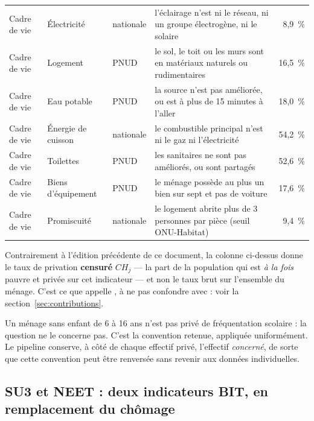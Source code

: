 \documentclass[11pt,a4paper]{article}
\begin{document}
\begin{center}
\begin{longtable}{@{}>{\RaggedRight}p{2.1cm}>{\RaggedRight}p{2.5cm}l>{\RaggedRight}p{5.4cm}r@{}}
\midrule
Cadre de vie & Électricité & nationale & l'éclairage n'est ni le réseau, ni un groupe
électrogène, ni le solaire & 8,9~\% \\
Cadre de vie & Logement & PNUD & le sol, le toit ou les murs sont en matériaux naturels ou
rudimentaires & 16,5~\% \\
Cadre de vie & Eau potable & PNUD & la source n'est pas améliorée, ou est à plus de 15 minutes
à l'aller & 18,0~\% \\
Cadre de vie & Énergie de cuisson & nationale & le combustible principal n'est ni le gaz ni
l'électricité & 54,2~\% \\
Cadre de vie & Toilettes & PNUD & les sanitaires ne sont pas améliorés, ou sont partagés
& 52,6~\% \\
Cadre de vie & Biens d'équipement & PNUD & le ménage possède au plus un bien sur sept et pas de
voiture & 17,6~\% \\
Cadre de vie & Promiscuité & nationale & le logement abrite plus de 3 personnes par pièce
(seuil ONU-Habitat) & 9,4~\% \\
\bottomrule
\end{longtable}
\end{center}

\begin{attention}
Contrairement à l'édition précédente de ce document, la colonne ci-dessus donne le taux de
privation \textbf{censuré} $CH_j$ --- la part de la population qui est \emph{à la fois} pauvre et
privée sur cet indicateur --- et non le taux brut sur l'ensemble du ménage. C'est ce que
 appelle , à ne pas confondre avec
 : voir la section~\ref{sec:contributions}.
\end{attention}

\begin{retenir}
Un ménage sans enfant de 6 à 16 ans n'est pas privé de fréquentation scolaire : la question ne le
concerne pas. C'est la convention retenue, appliquée uniformément. Le pipeline conserve, à côté de
chaque effectif privé, l'effectif \emph{concerné}, de sorte que cette convention peut être
renversée sans revenir aux données individuelles.
\end{retenir}

\subsection{SU3 et NEET : deux indicateurs BIT, en remplacement du chômage}
\end{document}

